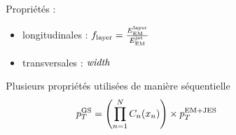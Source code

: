 \begin{frame}
\begin{columns}
\begin{column}{0.6\textwidth}
\end{column}
\begin{column}{0.55\textwidth}
\begin{maliste}
\item Propriétés :
\begin{itemize}
\item longitudinales : $f_{\rm layer}=\frac{E_{\rm EM}^{\rm layer}}{E_{\rm EM}^{\rm jet}}$
\item transversales : ${\rm\it width}$
\end{itemize}
\vspace*{0.3cm}
\item Plusieurs propri\'et\'es utilis\'ees de mani\`ere s\'equentielle
\[
p_T^{\rm GS}=\left(\prod\limits_{n=1}^{N}C_n(x_n)\right)\times p_T^{\rm EM+JES}
\]
\end{maliste}
\end{column}
\end{columns}

\end{frame}

